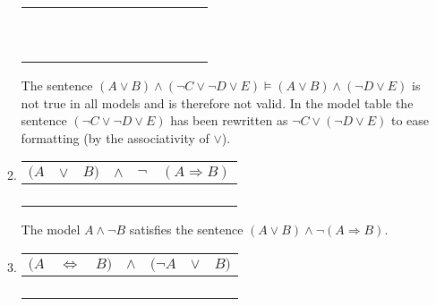 \begin{enumerate}
\begin{enumerate}
\begin{tabular}{ccccccccc|c|ccc}
\T & \T & \F & \F & \F & \F & \F & \F & \F & \T & \T& \F & \F \\
\T & \T & \F & \T & \F & \T & \F & \T & \T & \T & \T& \T & \T \\
\T & \T & \T & \T & \T & \T & \T & \T & \F & \T & \T& \T & \T \\
\T & \T & \T & \T & \T & \T & \T & \T & \T & \T & \T& \T & \T \\
\T & \T & \T & \T & \T & \T & \F & \F & \F & \F & \T& \F & \F \\
\T & \T & \T & \T & \T & \T & \F & \T & \T & \T & \T& \T & \T \\
\T & \T & \T & \T & \F & \T & \T & \T & \F & \T & \T& \T & \T \\
\T & \T & \T & \T & \F & \T & \T & \T & \T & \T & \T& \T & \T \\
\T & \T & \T & \F & \F & \F & \F & \F & \F & \T & \T& \F & \F \\
\T & \T & \T & \T & \F & \T & \F & \T & \T & \T & \T& \T & \T \\
\end{tabular}

The sentence $(A \lor B) \land (\neg C \lor \neg D \lor E) \vDash (A \lor B) \land (\neg D \lor E)$ is not true in all models and is therefore not valid. In the model table the sentence $(\neg C \lor \neg D \lor E)$ has been rewritten as $\neg C \lor (\neg D \lor E)$ to ease formatting (by the associativity of $\lor$).

\item
\begin{tabular}{ccc|c|cc}
$(A$ & $\lor$ & $B)$ & $\land$ & $\neg$ & $(A \Rightarrow B)$\\
\hline
\F & \F & \F & \F & \F & \T \\
\F & \T & \T & \F & \F & \T \\
\T & \T & \F & \T & \T & \F \\
\T & \T & \T & \F & \F & \T \\
\end{tabular}

The model $A \land \neg B$ satisfies the sentence $(A \lor B) \land \neg (A \Rightarrow B)$.

\item
\begin{tabular}{ccc|c|ccc}
$(A$ & $\Leftrightarrow$ & $B)$ & $\land$ & $(\neg A$ & $\lor$ & $B)$\\
\hline
\F & \T & \F & \T & \T & \T & \F \\
\F & \F & \T & \F & \T & \T & \T \\
\T & \F & \F & \F & \F & \F & \F \\
\T & \T & \T & \T & \F & \T & \T \\
\end{tabular}


\end{enumerate}
\end{enumerate}
